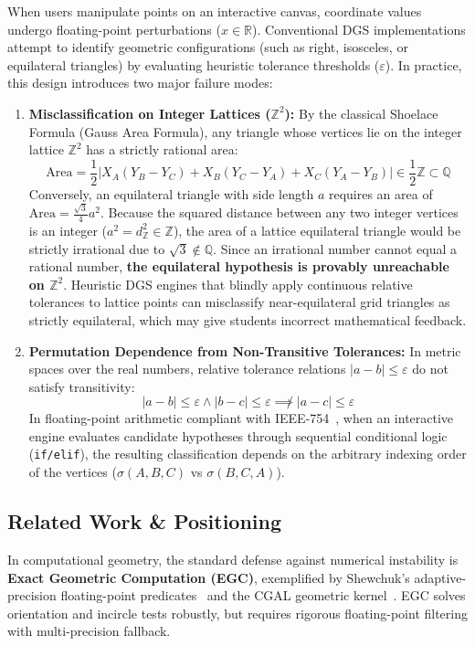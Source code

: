 \documentclass[preprint,12pt]{elsarticle}
\begin{document}
When users manipulate points on an interactive canvas, coordinate values undergo floating-point perturbations ($x \in \mathbb{R}$). Conventional DGS implementations attempt to identify geometric configurations (such as right, isosceles, or equilateral triangles) by evaluating heuristic tolerance thresholds ($\varepsilon$). In practice, this design introduces two major failure modes:
\begin{enumerate}
    \item \textbf{Misclassification on Integer Lattices ($\mathbb{Z}^2$):} By the classical Shoelace Formula (Gauss Area Formula), any triangle whose vertices lie on the integer lattice $\mathbb{Z}^2$ has a strictly rational area:
    \begin{equation}
    \text{Area} = \frac{1}{2} |X_A(Y_B - Y_C) + X_B(Y_C - Y_A) + X_C(Y_A - Y_B)| \in \frac{1}{2}\mathbb{Z} \subset \mathbb{Q}
    \end{equation}
    Conversely, an equilateral triangle with side length $a$ requires an area of $\text{Area} = \frac{\sqrt{3}}{4}a^2$. Because the squared distance between any two integer vertices is an integer ($a^2 = d_{\mathbb{Z}}^2 \in \mathbb{Z}$), the area of a lattice equilateral triangle would be strictly irrational due to $\sqrt{3} \notin \mathbb{Q}$. Since an irrational number cannot equal a rational number, \textbf{the equilateral hypothesis is provably unreachable on $\mathbb{Z}^2$}. Heuristic DGS engines that blindly apply continuous relative tolerances to lattice points can misclassify near-equilateral grid triangles as strictly equilateral, which may give students incorrect mathematical feedback.
    \item \textbf{Permutation Dependence from Non-Transitive Tolerances:} In metric spaces over the real numbers, relative tolerance relations $|a - b| \le \varepsilon$ do not satisfy transitivity:
    \begin{equation}
    |a - b| \le \varepsilon \land |b - c| \le \varepsilon \not\implies |a - c| \le \varepsilon
    \end{equation}
    In floating-point arithmetic compliant with IEEE-754~\cite{ieee754}, when an interactive engine evaluates candidate hypotheses through sequential conditional logic (\texttt{if/elif}), the resulting classification depends on the arbitrary indexing order of the vertices ($\sigma(A, B, C)$ vs $\sigma(B, C, A)$).
\end{enumerate}

\subsection{Related Work \& Positioning}
In computational geometry, the standard defense against numerical instability is \textbf{Exact Geometric Computation (EGC)}, exemplified by Shewchuk's adaptive-precision floating-point predicates~\cite{shewchuk1997} and the CGAL geometric kernel~\cite{cgal2024}. EGC solves orientation and incircle tests robustly, but requires rigorous floating-point filtering with multi-precision fallback.
\end{document}
